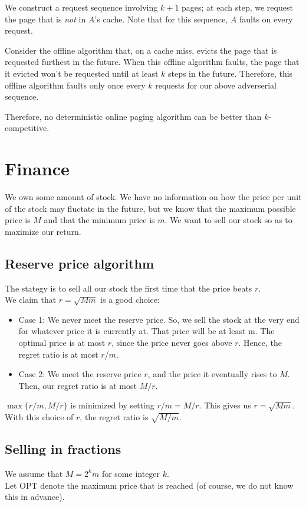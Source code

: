 \documentclass{article}
\begin{document}
We construct a request sequence involving $k+1$ pages;
at each step, we request the page that is \emph{not} in $A$'s cache.
Note that for this sequence, $A$ faults on every request.

Consider the offline algorithm that, on a cache miss, evicts the page
that is requested furthest in the future.
When this offline algorithm faults, the page that it evicted won't be
requested until at least $k$ steps in the future.
Therefore, this offline algorithm faults only once every $k$ requests
for our above adverserial sequence.

Therefore, no deterministic online paging algorithm can be better than
$k$-competitive.



\section{Finance}
We own some amount of stock.
We have no information on how the price per unit of the stock may fluctate
in the future, but we know that the maximum possible price is $M$ and that the
minimum price is $m$.
We want to sell our stock so as to maximize our return.

\subsection{Reserve price algorithm}
The stategy is to sell all our stock the first time that the
price beats $r$.
\\
We claim that $r=\sqrt{Mm}$ is a good choice:
\begin{itemize}
\item
Case 1: We never meet the reserve price. So, we sell the stock at the very end for whatever price it is currently at. That price will be at least m. The optimal price is at most $r$, since the price never goes above $r$. Hence, the regret ratio is at most $r$/$m$.
\item
Case 2: We meet the reserve price $r$, and the price it eventually rises to $M$.
Then, our regret ratio is  at most $M/r$.
\end{itemize}
$\max\{r/m, M/r\}$ is minimized by setting $r/m = M/r$.
This gives us $r = \sqrt{Mm}$.
With this choice of $r$, the regret ratio is $\sqrt{M/m}$.

\subsection{Selling in fractions}
We assume that $M = 2^k m$ for some integer $k$.
\\
Let OPT denote the maximum price that is reached 
(of course, we do not know this in advance).
\end{document}
